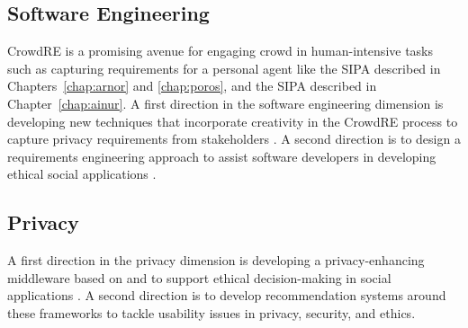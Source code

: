 \subsection{Software Engineering}
CrowdRE is a promising avenue for engaging crowd in human-intensive tasks such as capturing requirements for a personal agent like the \ringer SIPA described in Chapters~\ref{chap:arnor} and \ref{chap:poros}, and the \locationapp SIPA described in Chapter~\ref{chap:ainur}. 
A first direction in the software engineering dimension is developing new techniques that incorporate creativity in the CrowdRE process to capture privacy requirements from stakeholders \citep{Murukannaiah-RE16-Creative,Dhinakaran-RE18-ActiveAppReview}. 
A second direction is to design a requirements engineering approach to assist software developers in developing ethical social applications \citep{Ajmeri-AAMAS17-Arnor,Ajmeri-IC18-Ethical}. 


\subsection{Privacy}

A first direction in the privacy dimension is developing a privacy-enhancing middleware based on \frameworkB and \frameworkAinur to support ethical decision-making in social applications \citep{Ajmeri-HotSoS18-Ethics,Murukannaiah-TOSEM15-Platys}.
A second direction is to develop recommendation systems around these frameworks to tackle usability issues in privacy, security, and ethics.